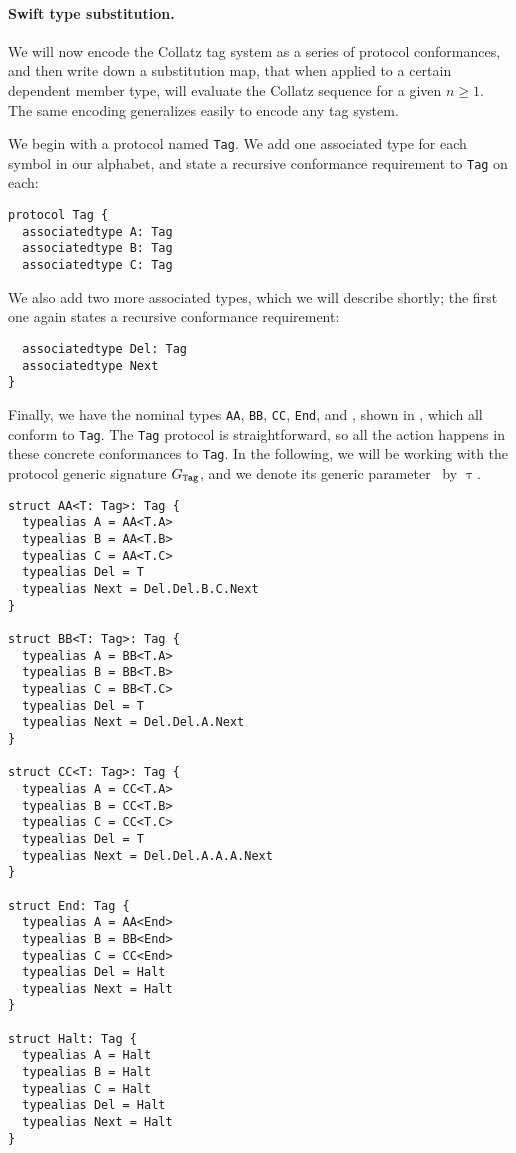 \documentclass[../generics]{subfiles}
\begin{document}
\newcommand{\AssocTypeA}{\AssocType{Tag}{A}}
\newcommand{\AssocTypeB}{\AssocType{Tag}{B}}
\newcommand{\AssocTypeC}{\AssocType{Tag}{C}}
\newcommand{\AssocTypeDel}{\AssocType{Tag}{Del}}
\newcommand{\AssocTypeNext}{\AssocType{Tag}{Next}}

\paragraph{Swift type substitution.}
We will now encode the Collatz tag system as a series of protocol conformances, and then write down a substitution map, that when applied to a certain dependent member type, will evaluate the Collatz sequence for a given $n \geq 1$. The same encoding generalizes easily to encode any tag system.

We begin with a protocol named \texttt{Tag}. We add one associated type for each symbol in our alphabet, and state a recursive conformance requirement to \texttt{Tag} on each:
\begin{Verbatim}
protocol Tag {
  associatedtype A: Tag
  associatedtype B: Tag
  associatedtype C: Tag
\end{Verbatim}
We also add two more associated types, which we will describe shortly; the first one again states a recursive conformance requirement:
\begin{Verbatim}
  associatedtype Del: Tag
  associatedtype Next
}
\end{Verbatim}
Finally, we have the nominal types \texttt{AA}, \texttt{BB}, \texttt{CC}, \texttt{End}, and \Halt, shown in , which all conform to \texttt{Tag}. The \texttt{Tag} protocol is straightforward, so all the action happens in these concrete conformances to \texttt{Tag}. In the following, we will be working with the protocol generic signature $G_\texttt{Tag}$, and we denote its generic parameter \rT\ by $\uptau$.

\begin{listing}\label{collatz listing}
\begin{Verbatim}[fontsize=\small]
struct AA<T: Tag>: Tag {
  typealias A = AA<T.A>
  typealias B = AA<T.B>
  typealias C = AA<T.C>
  typealias Del = T
  typealias Next = Del.Del.B.C.Next
}

struct BB<T: Tag>: Tag {
  typealias A = BB<T.A>
  typealias B = BB<T.B>
  typealias C = BB<T.C>
  typealias Del = T
  typealias Next = Del.Del.A.Next
}

struct CC<T: Tag>: Tag {
  typealias A = CC<T.A>
  typealias B = CC<T.B>
  typealias C = CC<T.C>
  typealias Del = T
  typealias Next = Del.Del.A.A.A.Next
}

struct End: Tag {
  typealias A = AA<End>
  typealias B = BB<End>
  typealias C = CC<End>
  typealias Del = Halt
  typealias Next = Halt
}

struct Halt: Tag {
  typealias A = Halt
  typealias B = Halt
  typealias C = Halt
  typealias Del = Halt
  typealias Next = Halt
}
\end{Verbatim}
\end{listing}
\end{document}
